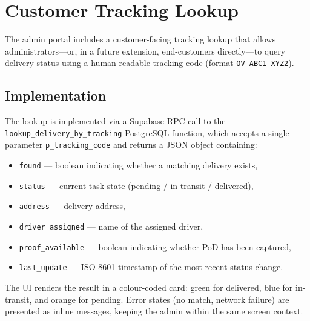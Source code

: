 \section{Customer Tracking Lookup}
\label{sec:tracking-impl}

The admin portal includes a customer-facing tracking lookup that allows
administrators—or, in a future extension, end-customers directly—to query
delivery status using a human-readable tracking code (format
\texttt{OV-ABC1-XYZ2}).

\subsection{Implementation}

The lookup is implemented via a Supabase RPC call to the
\texttt{lookup\_delivery\_by\_tracking} PostgreSQL function, which accepts a
single parameter \texttt{p\_tracking\_code} and returns a JSON object
containing:

\begin{itemize}
  \item \texttt{found} — boolean indicating whether a matching delivery exists,
  \item \texttt{status} — current task state (pending / in-transit / delivered),
  \item \texttt{address} — delivery address,
  \item \texttt{driver\_assigned} — name of the assigned driver,
  \item \texttt{proof\_available} — boolean indicating whether PoD has been captured,
  \item \texttt{last\_update} — ISO-8601 timestamp of the most recent status change.
\end{itemize}

The UI renders the result in a colour-coded card: green for delivered, blue for
in-transit, and orange for pending.  Error states (no match, network failure)
are presented as inline messages, keeping the admin within the same screen
context.
